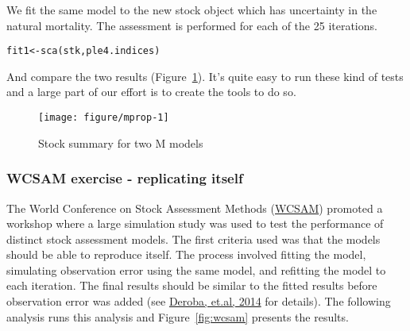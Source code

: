 \documentclass[a4paper,english,10pt]{article}\usepackage[]{graphicx}\usepackage[]{color}
\makeatletter
\def\maxwidth{ %
  \ifdim\Gin@nat@width>\linewidth
    \linewidth
  \else
    \Gin@nat@width
  \fi
}
\newcommand{\hlstd}[1]{\textcolor[rgb]{0,0,0}{#1}}%
\newcommand{\hlkwb}[1]{\textcolor[rgb]{0.361,0.506,0.596}{#1}}%
\newcommand{\hlkwd}[1]{\textcolor[rgb]{0.361,0.506,0.596}{#1}}%
\newenvironment{kframe}{%
 \def\at@end@of@kframe{}%
 \ifinner\ifhmode%
  \def\at@end@of@kframe{\end{minipage}}%
  \begin{minipage}{\columnwidth}%
 \fi\fi%
 \def\FrameCommand##1{\hskip\@totalleftmargin \hskip-\fboxsep
 \colorbox{shadecolor}{##1}\hskip-\fboxsep
     \hskip-\linewidth \hskip-\@totalleftmargin \hskip\columnwidth}%
 \MakeFramed {\advance\hsize-\width
   \@totalleftmargin\z@ \linewidth\hsize
   \@setminipage}}%
 {\par\unskip\endMakeFramed%
 \at@end@of@kframe}
\newenvironment{knitrout}{}{} %
\makeatother
\begin{document}
We fit the same model to the new stock object which has uncertainty in the natural mortality.
The assessment is performed for each of the 25 iterations.

\begin{knitrout}
\color{fgcolor}\begin{kframe}
\begin{alltt}
\hlstd{fit1} \hlkwb{<-} \hlkwd{sca}\hlstd{(stk, ple4.indices)}
\end{alltt}
\end{kframe}
\end{knitrout}

And compare the two results (Figure~\ref{fig:mprop}). It's quite easy to run these kind of tests and a large part of our effort is to create the tools to do so. 

\begin{knitrout}
\color{fgcolor}\begin{figure}[H]

{\centering \texttt{[image: figure/mprop-1]} 

}

\caption[Stock summary for two M models]{Stock summary for two M models\label{fig:mprop}}
\end{figure}


\end{knitrout}



\subsubsection{WCSAM exercise - replicating itself}

The World Conference on Stock Assessment Methods (\href{http://www.ices.dk/news-and-events/symposia/WCSAM-2013}{WCSAM}) promoted a workshop where a large simulation study was used to test the performance of distinct stock assessment models. The first criteria used was that the models should be able to reproduce itself. The process involved fitting the model, simulating observation error using the same model, and refitting the model to each iteration. The final results should be similar to the fitted results before observation error was added (see \href{http://icesjms.oxfordjournals.org/content/early/2014/01/18/icesjms.fst237.abstract}{Deroba, et.al, 2014} for details). The following analysis runs this analysis and Figure~\ref{fig:wcsam} presents the results.
\end{document}
